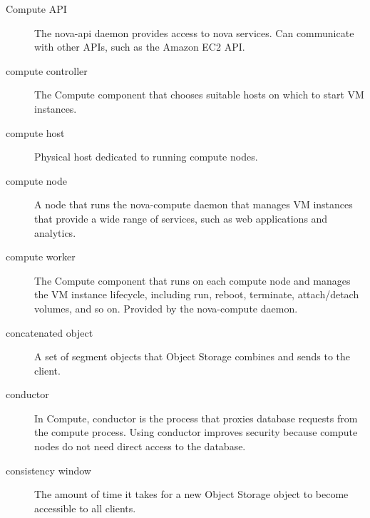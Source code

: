 \documentclass[letterpaper,10pt,english]{sphinxmanual}
\begin{document}
\begin{description}
\item[{Compute API}] \leavevmode{}\label{_source/glossary:term-compute-api}
The nova-api daemon
provides access to nova services. Can communicate with other APIs,
such as the Amazon EC2 API.

\item[{compute controller}] \leavevmode{}\label{_source/glossary:term-compute-controller}
The Compute component that chooses suitable hosts on which to
start VM instances.

\item[{compute host}] \leavevmode{}\label{_source/glossary:term-compute-host}
Physical host dedicated to running compute nodes.

\item[{compute node}] \leavevmode{}\label{_source/glossary:term-compute-node}
A node that runs the nova-compute daemon that manages VM
instances that provide a wide
range of services, such as web applications and analytics.

\item[{compute worker}] \leavevmode{}\label{_source/glossary:term-compute-worker}
The Compute component that runs on each compute node and manages
the VM instance lifecycle, including run, reboot, terminate,
attach/detach volumes, and so on. Provided by the nova-compute daemon.

\item[{concatenated object}] \leavevmode{}\label{_source/glossary:term-concatenated-object}
A set of segment objects that Object Storage combines and sends
to the client.

\item[{conductor}] \leavevmode{}\label{_source/glossary:term-conductor}
In Compute, conductor is the process that proxies database
requests from the compute process. Using conductor improves security
because compute nodes do not need direct access to the
database.

\item[{consistency window}] \leavevmode{}\label{_source/glossary:term-consistency-window}
The amount of time it takes for a new Object Storage object to
become accessible to all clients.


\end{description}
\end{document}
